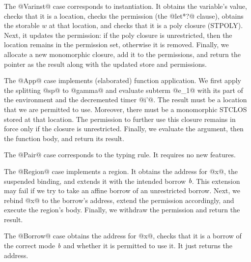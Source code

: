 The @Varinst@ case corresponds to instantiation. It
obtains the variable's value, checks that it is a location, checks the
permission (the @let*?@ clause), obtains the storable $w$ at that
location, and checks that it is a poly closure (STPOLY). Next, it updates the
permission: if the poly closure is unrestricted, then the location
remains in the permission set, otherwise it is removed. Finally, we
allocate a new monomorphic closure, add it to the permissions, and
return the pointer as the result along with the updated store and
permissions.

The @App@ case implements (elaborated) function application.
We first apply the splitting @sp@ to @gamma@ and
evaluate subterm @e_1@ with its part of the environment and the
decremented timer @i'@. The result must be a location that we are
permitted to use. Moreover, there must be a monomorphic STCLOS stored
at that location. The permission to further use this closure  remains
in force only if the closure is unrestricted. Finally, we evaluate the
argument, then the function body, and return its result.

The @Pair@ case corresponds to the  typing rule. It
requires no new features.


The @Region@ case implements a region. It obtains the address for @x@,
the suspended binding, and extends it with the intended borrow
$\textit{b}$. This extension may fail if we try to take an affine borrow
of an unrestricted borrow. Next, we rebind @x@ to the borrow's
address, extend the permission accordingly, and execute the region's
body.  Finally, we withdraw the permission and return the result.

The @Borrow@ case obtains the address for @x@, checks that it is a
borrow of the correct mode $\textit{b}$ and whether it is permitted to
use it. It just returns the address.

\lstDeleteShortInline@

